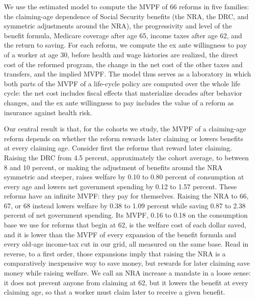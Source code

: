 We use the estimated model to compute the MVPF of 66 reforms in five families: the claiming-age dependence of Social Security benefits (the NRA, the DRC, and symmetric adjustments around the NRA), the progressivity and level of the benefit formula, Medicare coverage after age 65, income taxes after age 62, and the return to saving. For each reform, we compute the ex ante willingness to pay of a worker at age 30, before health and wage histories are realized, the direct cost of the reformed program, the change in the net cost of the other taxes and transfers, and the implied MVPF. The model thus serves as a laboratory in which both parts of the MVPF of a life-cycle policy are computed over the whole life cycle: the net cost includes fiscal effects that materialize decades after behavior changes, and the ex ante willingness to pay includes the value of a reform as insurance against health risk.

Our central result is that, for the cohorts we study, the MVPF of a claiming-age reform depends on whether the reform rewards later claiming or lowers benefits at every claiming age. Consider first the reforms that reward later claiming. Raising the DRC from 4.5 percent, approximately the cohort average, to between 8 and 10 percent, or making the adjustment of benefits around the NRA symmetric and steeper, raises welfare by 0.10 to 0.80 percent of consumption at every age and lowers net government spending by 0.12 to 1.57 percent. These reforms have an infinite MVPF: they pay for themselves. Raising the NRA to 66, 67, or 68 instead lowers welfare by 0.38 to 1.09 percent while saving 0.87 to 2.38 percent of net government spending. Its MVPF, 0.16 to 0.18 on the consumption base we use for reforms that begin at 62, is the welfare cost of each dollar saved, and it is lower than the MVPF of every expansion of the benefit formula and every old-age income-tax cut in our grid, all measured on the same base. Read in reverse, to a first order, those expansions imply that raising the NRA is a comparatively inexpensive way to save money, but rewards for later claiming save money while raising welfare. We call an NRA increase a mandate in a loose sense: it does not prevent anyone from claiming at 62, but it lowers the benefit at every claiming age, so that a worker must claim later to receive a given benefit.

